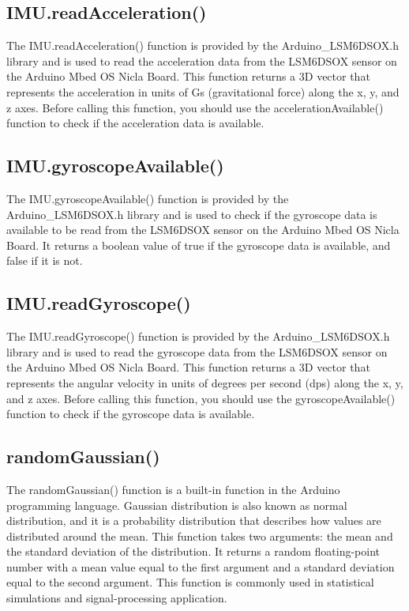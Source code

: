 \subsection{IMU.readAcceleration()}
The IMU.readAcceleration() function is provided by the Arduino\_LSM6DSOX.h library and is used to read the acceleration data from the LSM6DSOX sensor on the Arduino Mbed OS Nicla Board. This function returns a 3D vector that represents the acceleration in units of Gs (gravitational force) along the x, y, and z axes. Before calling this function, you should use the accelerationAvailable() function to check if the acceleration data is available.

\subsection{IMU.gyroscopeAvailable()}
The IMU.gyroscopeAvailable() function is provided by the Arduino\_LSM6DSOX.h library and is used to check if the gyroscope data is available to be read from the LSM6DSOX sensor on the Arduino Mbed OS Nicla Board. It returns a boolean value of true if the gyroscope data is available, and false if it is not.

\subsection{IMU.readGyroscope()}
The IMU.readGyroscope() function is provided by the Arduino\_LSM6DSOX.h library and is used to read the gyroscope data from the LSM6DSOX sensor on the Arduino Mbed OS Nicla Board. This function returns a 3D vector that represents the angular velocity in units of degrees per second (dps) along the x, y, and z axes. Before calling this function, you should use the gyroscopeAvailable() function to check if the gyroscope data is available.

\subsection{randomGaussian() }
The randomGaussian() function is a built-in function in the Arduino programming language. Gaussian distribution is also known as normal distribution, and it is a probability distribution that describes how values are distributed around the mean. This function takes two arguments: the mean and the standard deviation of the distribution. It returns a random floating-point number with a mean value equal to the first argument and a standard deviation equal to the second argument. This function is commonly used in statistical simulations and signal-processing application.

